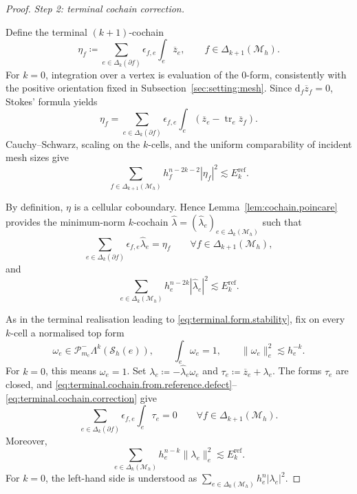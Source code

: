 \documentclass[a4paper,11pt]{article}
\theoremstyle{definition}
\newcommand{\DIFF}{\mathrm{d}}
\newcommand{\Mh}{\mathcal{M}_h}
\newcommand{\Sh}{\mathcal{S}_h}
\newcommand{\FM}[1]{\Delta_{#1}}
\newcommand{\PLtrim}[2]{\mathcal{P}_{#1}^{-}\Lambda^{#2}}
\newcommand{\trc}{\operatorname{tr}}
\begin{document}
\begin{proof}
\medskip
\noindent\emph{Step 2: terminal cochain correction.}

Define the terminal $(k+1)$-cochain
\[
  \eta_f
  \coloneqq
  \sum_{e\in\FM{k}(\partial f)}
  \epsilon_{f,e}
  \int_e\overline z_e,
  \qquad
  f\in\FM{k+1}(\Mh).
\]
For $k=0$, integration over a vertex is evaluation of the $0$-form, consistently with the positive orientation fixed in Subsection~\ref{sec:setting:mesh}.
Since $\DIFF_f\overline z_f=0$, Stokes' formula yields
\begin{equation}
\label{eq:terminal.cochain.from.reference.defect}
  \eta_f
  =
  \sum_{e\in\FM{k}(\partial f)}
  \epsilon_{f,e}
  \int_e
  \left(
    \overline z_e-\trc_e\overline z_f
  \right).
\end{equation}
Cauchy--Schwarz, scaling on the $k$-cells, and the uniform comparability of incident mesh sizes give
\[
  \sum_{f\in\FM{k+1}(\Mh)}
  h_f^{n-2k-2}|\eta_f|^2
  \lesssim
  E_k^{\mathrm{ref}}.
\]

By definition, $\eta$ is a cellular coboundary.
Hence Lemma~\ref{lem:cochain.poincare} provides the minimum-norm $k$-cochain $\widehat\lambda=(\widehat\lambda_e)_{e\in\FM{k}(\Mh)}$ such that
\begin{equation}
\label{eq:terminal.cochain.correction}
  \sum_{e\in\FM{k}(\partial f)}
  \epsilon_{f,e}\widehat\lambda_e
  =
  \eta_f
  \qquad
  \forall f\in\FM{k+1}(\Mh),
\end{equation}
and
\[
  \sum_{e\in\FM{k}(\Mh)}
  h_e^{n-2k}|\widehat\lambda_e|^2
  \lesssim
  E_k^{\mathrm{ref}}.
\]

As in the terminal realisation leading to \eqref{eq:terminal.form.stability}, fix on every $k$-cell a normalised top form
\[
  \omega_e
  \in
  \PLtrim{m_{\mathrm c}}{k}(\Sh(e)),
  \qquad
  \int_e\omega_e=1,
  \qquad
  \|\omega_e\|_e^2
  \lesssim
  h_e^{-k}.
\]
For $k=0$, this means $\omega_e=1$.
Set $\lambda_e\coloneqq-\widehat\lambda_e\omega_e$ and $\tau_e \coloneqq\overline z_e+\lambda_e$.
The forms $\tau_e$ are closed, and \eqref{eq:terminal.cochain.from.reference.defect}-- \eqref{eq:terminal.cochain.correction} give
\begin{equation}
\label{eq:terminal.closed.compatibility}
  \sum_{e\in\FM{k}(\partial f)}
  \epsilon_{f,e}
  \int_e\tau_e
  =
  0
  \qquad
  \forall f\in\FM{k+1}(\Mh).
\end{equation}
Moreover,
\begin{equation}
\label{eq:terminal.closed.correction.stability}
  \sum_{e\in\FM{k}(\Mh)}
  h_e^{n-k}\|\lambda_e\|_e^2
  \lesssim
  E_k^{\mathrm{ref}}.
\end{equation}
For $k=0$, the left-hand side is understood as $\sum_{e\in\FM{0}(\Mh)}h_e^n|\lambda_e|^2$.


\end{proof}
\end{document}
